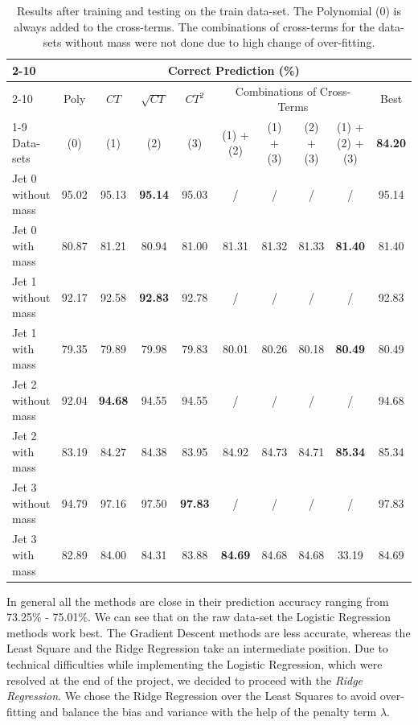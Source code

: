 \documentclass[10pt,conference,compsocconf]{IEEEtran}
\begin{document}
\begin{table}[!b]
    \centering
    \begin{tabular}{|l|c||c|c|c|c|c|c|c||c|}
        \cline{2-10} 
        \multicolumn{1}{}{} & \multicolumn{9}{|c|}{Correct Prediction (\%)} \\ \cline{2-10}
        \multicolumn{1}{c|}{} & Poly & $CT$ & $\sqrt{CT}$ & $CT^2$ & \multicolumn{4}{c||}{Combinations of Cross-Terms} & Best \\ \cline{1-9}
        Data-sets & (0) & (1) & (2)  & (3) & (1) + (2) & (1) + (3) & (2) + (3) & (1) + (2) + (3) & {\bf \color{ao} 84.20} \\ \hline \hline
        Jet 0 without mass  & 95.02 & 95.13 & {\bf \color{ao} 95.14} & 95.03 & /     & /     & /     & /     & 95.14 \\ 
        Jet 0 with mass     & 80.87 & 81.21 & 80.94 & 81.00 & 81.31 & 81.32 & 81.33 & {\bf \color{ao} 81.40} & 81.40 \\
        Jet 1 without mass  & 92.17 & 92.58 & {\bf \color{ao} 92.83} & 92.78 & /     & /     & /     & /     & 92.83 \\
        Jet 1 with mass     & 79.35 & 79.89 & 79.98 & 79.83 & 80.01 & 80.26 & 80.18 & {\bf \color{ao} 80.49} & 80.49 \\
        Jet 2 without mass  & 92.04 & {\bf \color{ao} 94.68} & 94.55 & 94.55 & /     & /     & /     & /     & 94.68 \\
        Jet 2 with mass     & 83.19 & 84.27 & 84.38 & 83.95 & 84.92 & 84.73 & 84.71 & {\bf \color{ao} 85.34} & 85.34 \\
        Jet 3 without mass  & 94.79 & 97.16 & 97.50 & {\bf \color{ao} 97.83} & /     & /     & /     & /     & 97.83 \\  
        Jet 3 with mass     & 82.89 & 84.00 & 84.31 & 83.88 & {\bf \color{ao} 84.69} & 84.68 & 84.68 & 33.19 & 84.69 \\ \hline \hline
    \end{tabular}
    \caption{Results after training and testing on the train data-set. The Polynomial (0) is always added to the cross-terms. \newline The combinations of cross-terms for the data-sets without mass were not done due to high change of over-fitting.}
    \label{tab:results}
\end{table}
\vspace{-0.5cm}
In general all the methods are close in their prediction accuracy ranging from 73.25\% - 75.01\%. We can see that on the raw data-set the Logistic Regression methods work best. The Gradient Descent methods are less accurate, whereas the Least Square and the Ridge Regression take an intermediate position. Due to technical difficulties while implementing the Logistic Regression, which were resolved at the end of the project, we decided to proceed with the \emph{Ridge Regression}. We chose the Ridge Regression over the Least Squares to avoid over-fitting and balance the bias and variance with the help of the penalty term $\lambda$.
\end{document}
